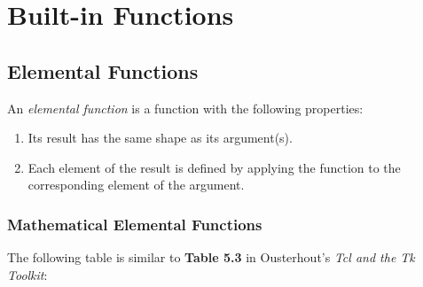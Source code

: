 
\section{Built-in Functions}
    \label{function}

\subsection{Elemental Functions}
    \label{function-Elemental}

An \emph{elemental function} is a function with the following properties:
\begin{enumerate}
    \item Its result has the same shape as its argument(s).
    \item Each element of the result is defined by applying the
	function to the corresponding element of the argument.
\end{enumerate}

\subsubsection{Mathematical Elemental Functions}
\label{Mathematical-Elemental-Functions}

The following table is similar to \textbf{Table 5.3} in Ousterhout's \emph{Tcl and the Tk Toolkit}:

